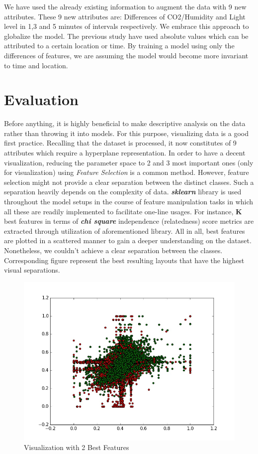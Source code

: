 \documentclass[conference]{IEEEtran}
\begin{document}
We have used the already existing information to augment the data with 9 new attributes. These 9 new attributes are: Differences of CO2/Humidity and Light level in 1,3 and 5 minutes of intervals respectively. We embrace this approach to globalize the model. The previous study \cite{Pedersen} have used absolute values which can be attributed to a certain location or time. By training a model using only the differences of features, we are assuming the model would become more invariant to time and location.


\section{Evaluation}
Before anything, it is highly beneficial to make descriptive analysis on the data rather than throwing it into models. For this purpose, visualizing data is a good first practice. Recalling that the dataset is processed, it now constitutes of 9 attributes which require a hyperplane representation. In order to have a decent visualization, reducing the parameter space to 2 and 3 most important ones (only for visualization) using \textit{Feature Selection}\cite{Guyon} is a common method. However, feature selection might not provide a clear separation between the distinct classes. Such a separation heavily depends on the complexity of data. \textit{\textbf{sklearn}} library is used throughout the model setups in the course of feature manipulation tasks in which all these are readily implemented to facilitate one-line usages. For instance, \textbf{K} best features in terms of \textit{\textbf{chi square}}\cite{Fahim} independence (relatedness) score metrics are extracted through utilization of aforementioned library. All in all, best features are plotted in a scattered manner to gain a deeper understanding on the dataset. Nonetheless, we couldn't achieve a clear separation between the classes. Corresponding figure represent the best resulting layouts that have the highest visual separations.

\begin{figure}[H]
	\includegraphics[width=1\columnwidth]{best_2features.jpg}
	\caption{Visualization with 2 Best Features}
	\label{2plot}
\end{figure}
\end{document}
